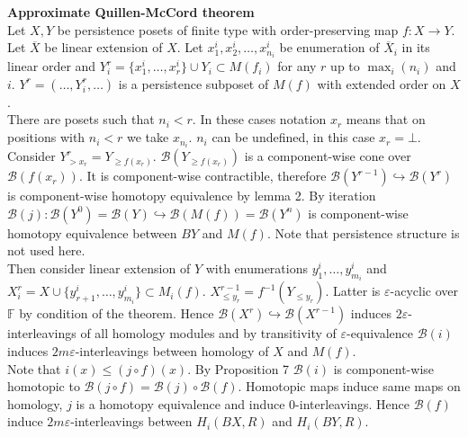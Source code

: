 \begin{pf} \textbf{Approximate Quillen-McCord theorem}\\
  Let $X, Y$ be persistence posets of finite type with order-preserving map $f : X \to Y$.\\

  Let $\overline{X}$ be linear extension of $X$. Let $x^i_1, x^i_2, \ldots, x^i_{n_i}$ be enumeration of $\overline{X}_i$ in its linear order and $Y_i^r = \{x^i_1,\ldots,x^i_r\} \cup Y_i \subset M(f_i)$ for any $r$ up to $\max_{i}(n_i)$ and $i$. $Y^r = (\ldots, Y_i^r, \ldots)$ is a persistence subposet of $M(f)$ with extended order on $X$.\\

  There are posets such that $n_i < r$. In these cases notation $x_r$ means that on positions with $n_i < r$ we take $x_{n_i}$. $n_i$ can be undefined, in this case $x_r = \bot$.\\

  Consider $Y^r_{>x_r} = Y_{\geq f(x_r)}$. $\mathcal{B}(Y_{\geq f(x_r)})$ is a component-wise cone over $\mathcal{B}(f(x_r))$. It is component-wise contractible, therefore $\mathcal{B}(Y^{r-1}) \hookrightarrow \mathcal{B}(Y^{r})$ is component-wise homotopy equivalence by lemma 2. By iteration $\mathcal{B}(j) : \mathcal{B}(Y^{0}) = \mathcal{B}(Y) \hookrightarrow \mathcal{B}(M(f)) = \mathcal{B}(Y^n)$ is component-wise homotopy equivalence between $BY$ and $M(f)$. Note that persistence structure is not used here.\\

  Then consider linear extension of $Y$ with enumerations $y^i_1,\ldots,y^i_{m_i}$ and $X_i^r = X \cup \{y^i_{r+1},\ldots,y^i_{m_i}\} \subset M_i(f)$. $X^{r-1}_{\leq y_r} = f^{-1}(Y_{\leqslant y_r})$. Latter is $\varepsilon$-acyclic over $\mathbb{F}$ by condition of the theorem. Hence $\mathcal{B}(X^{r}) \hookrightarrow \mathcal{B}(X^{r-1})$ induces $2\varepsilon$-interleavings of all homology modules and by transitivity of $\varepsilon$-equivalence $\mathcal{B}(i)$ induces $2m\varepsilon$-interleavings between homology of $X$ and $M(f)$.\\

  Note that $i(x) \leqslant (j \circ f)(x)$. By Proposition 7 $\mathcal{B}(i)$ is component-wise homotopic to $\mathcal{B}(j \circ f) = \mathcal{B}(j) \circ \mathcal{B}(f)$. Homotopic maps induce same maps on homology, $j$ is a homotopy equivalence and induce $0$-interleavings. Hence $\mathcal{B}(f)$ induce $2m\varepsilon$-interleavings between $H_i(BX,R)$ and $H_i(BY,R)$.
\end{pf}

